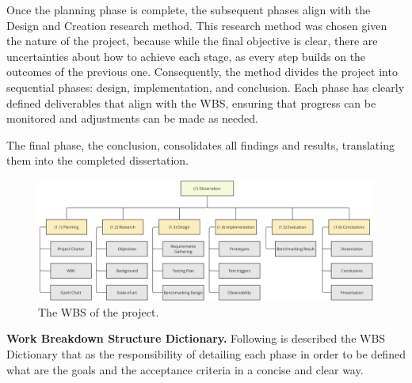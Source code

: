 Once the planning phase is complete, the subsequent phases align with the Design and Creation research method. This research method was chosen given the nature of the project, because while the final objective is clear, there are uncertainties about how to achieve each stage, as every step builds on the outcomes of the previous one. Consequently, the method divides the project into sequential phases: design, implementation, and conclusion. Each phase has clearly defined deliverables that align with the \gls{WBS}, ensuring that progress can be monitored and adjustments can be made as needed.

The final phase, the conclusion, consolidates all findings and results, translating them into the completed dissertation.


\begin{figure}
      \centering
      \includegraphics[width=\linewidth]{ch-planning/assets/wbs.png}
      \caption{The \gls{WBS} of the project.}
      \label{fig:wbs}
\end{figure}


\textbf{Work Breakdown Structure Dictionary.} Following is described the \gls{WBS} Dictionary that as the responsibility of detailing each phase in order to be defined what are the goals and the acceptance criteria in a concise and clear way.

